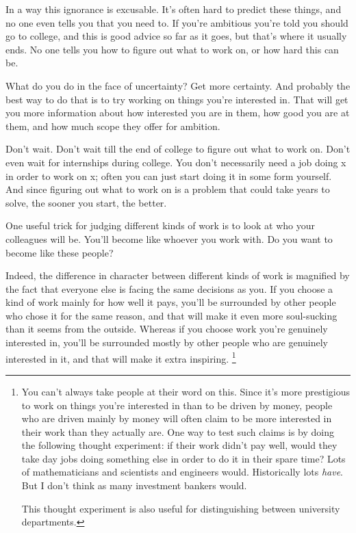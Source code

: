 \documentclass[12pt]{book}
\begin{document}
In a way this ignorance is excusable. It's often hard to predict these
things, and no one even tells you that you need to. If you're ambitious
you're told you should go to college, and this is good advice so far as
it goes, but that's where it usually ends. No one tells you how to
figure out what to work on, or how hard this can be.

What do you do in the face of uncertainty? Get more certainty. And
probably the best way to do that is to try working on things you're
interested in. That will get you more information about how interested
you are in them, how good you are at them, and how much scope they offer
for ambition.

Don't wait. Don't wait till the end of college to figure out what to
work on. Don't even wait for internships during college. You don't
necessarily need a job doing x in order to work on x; often you can just
start doing it in some form yourself. And since figuring out what to
work on is a problem that could take years to solve, the sooner you
start, the better.

One useful trick for judging different kinds of work is to look at who
your colleagues will be. You'll become like whoever you work with. Do
you want to become like these people?

Indeed, the difference in character between different kinds of work is
magnified by the fact that everyone else is facing the same decisions as
you. If you choose a kind of work mainly for how well it pays, you'll be
surrounded by other people who chose it for the same reason, and that
will make it even more soul-sucking than it seems from the outside.
Whereas if you choose work you're genuinely interested in, you'll be
surrounded mostly by other people who are genuinely interested in it,
and that will make it extra inspiring. \footnote{You can't always take people at their word on this. Since it's
more prestigious to work on things you're interested in than to be
driven by money, people who are driven mainly by money will often claim
to be more interested in their work than they actually are. One way to
test such claims is by doing the following thought experiment: if their
work didn't pay well, would they take day jobs doing something else in
order to do it in their spare time? Lots of mathematicians and
scientists and engineers would. Historically lots \emph{have}. But I
don't think as many investment bankers would.

This thought experiment is also useful for distinguishing between
university departments.}
\end{document}
